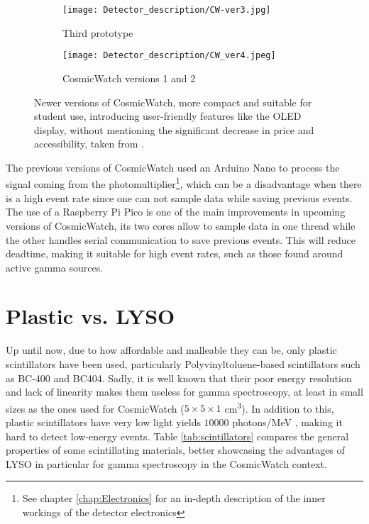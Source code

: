 \begin{figure}[H]
  \begin{subfigure}[t]{0.45\textwidth}
    \centering
    \texttt{[image: Detector\_description/CW-ver3.jpg]}
    \caption{\label{sfig:CW_ver3} Third prototype}
  \end{subfigure}
  \hfill
  \begin{subfigure}[t]{0.45\textwidth}
    \centering
    \texttt{[image: Detector\_description/CW\_ver4.jpeg]}
    \caption{\label{sfig:CW_ver4} CosmicWatch versions 1 and 2}
  \end{subfigure}
  \caption{\label{fig:CW_ver3_ver4}Newer versions of CosmicWatch, more compact and suitable for student use, introducing user-friendly features like the OLED display, without mentioning the significant decrease in price and accessibility, taken from \cite{CosmicWatch}.}
\end{figure}

The previous versions of CosmicWatch used an Arduino Nano to process the signal coming from the photomultiplier\footnote{See chapter \ref{chap:Electronics} for an in-depth description of the inner workings of the detector electronics}, which can be a disadvantage when there is a high event rate since one can not sample data while saving previous events. The use of a Raspberry Pi Pico is one of the main improvements in upcoming versions of CosmicWatch, its two cores allow to sample data in one thread while the other handles serial communication to save previous events. This will reduce deadtime, making it suitable for high event rates, such as those found around active gamma sources.

\section{Plastic vs. LYSO}

Up until now, due to how affordable and malleable they can be, only plastic scintillators have been used, particularly Polyvinyltoluene-based scintillators such as BC-400 and BC404. Sadly, it is well known that their poor energy resolution and lack of linearity makes them useless for gamma spectroscopy, at least in small sizes as the ones used for CosmicWatch ($5\times5\times1$ \unit{\cm\cubed}). In addition to this, plastic scintillators have very low light yields $10000$ photons/MeV \cite{mukhopadhyay2004plastic}, making it hard to detect low-energy events. Table \ref{tab:scintillators} compares the general properties of some scintillating materials, better showcasing the advantages of LYSO in particular for gamma spectroscopy in the CosmicWatch context.


